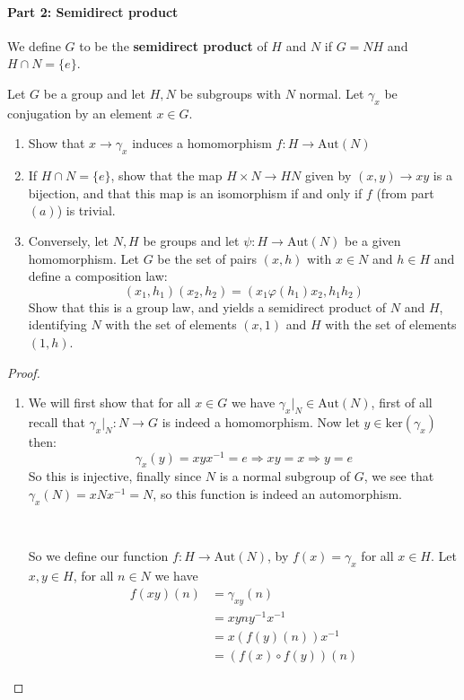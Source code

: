 
\paragraph*{Part 2: Semidirect product}
We define $G$ to be the \textbf{semidirect product} of $H$ and $N$ if $G=NH$ and $H\cap N = \{e\}$.


\begin{exercise}
    Let $G$ be a group and let $H,N$ be subgroups with $N$ normal. Let $\gamma_x$ be conjugation by an element $x\in G$.\begin{enumerate}[label = (\alph*)]
        \item Show that $x\rightarrow \gamma_x$ induces a homomorphism $f\colon H\rightarrow \text{Aut}(N)$
        \item If $H\cap N = \{e\}$, show that the map $H\times N\rightarrow HN$ given by $(x,y) \rightarrow xy$ is a bijection, and that this map is an isomorphism if and only if $f$ (from part $(a)$) is trivial.
        \item Conversely, let $N,H$ be groups and let $\psi\colon H\rightarrow \text{Aut}(N)$ be a given homomorphism. Let $G$ be the set of pairs $(x,h)$ with $x\in N$ and $h\in H$ and define a composition law:\begin{equation*}
            (x_1,h_1)(x_2,h_2) = ({x_1}{\varphi(h_1)x_2}, h_1h_2)
        \end{equation*}
        Show that this is a group law, and yields a semidirect product of $N$ and $H$, identifying $N$ with the set of elements $(x,1)$ and $H$ with the set of elements $(1,h)$.
    \end{enumerate}
    \begin{proof}
        \begin{enumerate}[label = (\alph*)]
            \item We will first show that for all $x\in G$ we have $\gamma_x|_N\in \text{Aut}(N)$, first of all recall that $\gamma_x|_N\colon N\rightarrow G$ is indeed a homomorphism. Now let $y\in \text{ker}(\gamma_x)$ then:
            \[
                \gamma_x(y) = xyx^{-1} = e \Rightarrow xy = x \Rightarrow y = e
                \]
                So this is injective, finally since $N$ is a normal subgroup of $G$, we see that $\gamma_x(N) = xNx^{-1} = N$, so this function is indeed an automorphism.

                \

                So we define our function $f\colon H\rightarrow \text{Aut}(N)$, by $f(x) = \gamma_x$ for all $x\in H$. Let $x,y\in H$, for all $n\in N$ we have \begin{align*}
                    f(xy)(n) &= \gamma_{xy}(n)\\
                             &= xyny^{-1}x^{-1}\\
                             &= x({f(y)(n)})x^{-1}\\
                             &=({f(x)\circ f(y)})(n)
                \end{align*}


\end{enumerate}
\end{proof}
\end{exercise}
